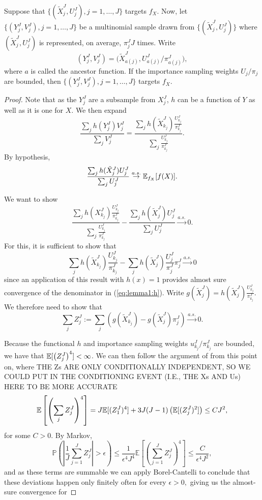 \documentclass{article}
\begin{document}
\begin{lem}
    \label{lem:change-measure-proper-weights}
    Suppose that $\{(\tilde X_j^J,U_j^J),j=1,\dots,J\}$ targets $f_X$. Now, let $\{(Y_j^J,V_j^J),j=1,\dots,J\}$ be a multinomial sample drawn from $\{(\tilde X_j^J,U_j^J)\}$ where $(\tilde X_j^J,U_j^J)$ is represented, on average, $\pi^J_j J$ times. Write
    \[
    (Y_j^J,V_j^J) = \big(\tilde X^J_{a(j)},U^J_{a(j)}/\pi^J_{a(j)}\big),
    \]
    where $a$ is called the ancestor function. If the importance sampling weights $U_j/\pi_j$ are bounded, then $\{(Y^J_j,V^J_j),j=1,\dots,J\}$ targets $f_X$.
\end{lem}

\begin{proof}


    Note that as the $Y_j^J$ are a subsample from $X_j^J$, $h$ can be a function of $Y$ as well as it is one for $X$. We then expand
    $$\frac{\sum_j h(Y_j^J) V_j^J}{\sum_j V_j^J} = \frac{\sum_j h(\tilde X_{k_j}^J)\frac{U_{k_j}^J}{\pi_{k_j}^J}}{\sum_j \frac{U_{k_j}^J}{\pi_{k_j}^J}}.$$
    By hypothesis,
    $$\frac{\sum_j h(\tilde X_j^J)U_j^J}{\sum_j U_j^J} \stackrel{a.s.}{\to} \mathbb{E}_{f_X}[f(X)].$$

    We want to show
    \begin{equation}\label{eq:lemma1:h}
    \frac{\sum_j h(X_{k_j}^J)\frac{U_{k_j}^J}{\pi_{k_j}^J}}{\sum_j \frac{U_{k_j}^J}{\pi_{k_j}^J}} - \frac{\sum_j h(\tilde X_j^J)U_j^J}{\sum_j U_j^J} \stackrel{a.s.}{\to} 0.
    \end{equation}
    For this, it is sufficient to show that
   $$ \sum_j h(\tilde X_{k_j}^J)\frac{U_{k_j}^J}{\pi_{k_j}^J}
    -  \sum_j h(\tilde X_j^J)\frac{U_j^J}{\pi_j^J}\pi_j^J \stackrel{a.s.}{\to} 0 $$
    since an application of this result with $h(x)=1$ provides almost sure convergence of the denominator in (\ref{eq:lemma1:h}).
    Write $g(\tilde X_j^J) = h(\tilde X_j^J)\frac{U_{k_j}^J}{\pi_{k_j}^J}$. We therefore need to show that 
    $$\sum_j Z_j^J := \sum_j \left(g(\tilde X_{k_j}^J) -  g(\tilde X_j^J) \pi_j^J \right) \stackrel{a.s.}{\to} 0.$$

    Because the functional $h$ and importance sampling weights $u_{k_j}^J/\pi_{k_j}^J$ are bounded, we have that $\mathbb{E}[\left(Z_j^J\right)^4] < \infty$. We can then follow the argument of \cite{chopin20} from this point on, where 
    {THE Zs ARE ONLY CONDITIONALLY INDEPENDENT, SO WE COULD PUT IN THE CONDITIONING EVENT (I.E., THE Xs AND Us) HERE TO BE MORE ACCURATE}
    $$\mathbb{E}\left[\left(\sum_j Z_j^J\right)^4\right] 
    = J\mathbb{E}[(Z_1^J)^4] + 3J(J-1)\left(\mathbb{E}[(Z_j^J)^2]\right) \leq CJ^2,$$ for some $C>0$. By Markov, 
    $$\mathbb{P}\left(\left|\frac{1}{J} \sum_{j=1}^J Z_j^J\right|>\epsilon\right) 
    \leq \frac{1}{\epsilon^4J^4 } 
    \mathbb{E}\left[\left(\sum_{j=1}^J Z_j^J\right)^4\right] \leq \frac{C}{\epsilon^4J^2},$$
    and as these terms are summable we can apply Borel-Cantelli to conclude that these deviations happen only finitely often for every $\epsilon>0,$ giving us the almost-sure convergence for
    

\end{proof}
\end{document}
